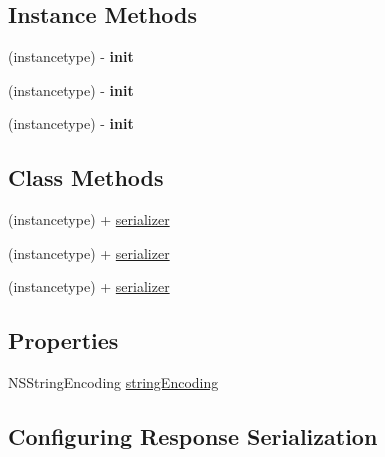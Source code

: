\subsection*{Instance Methods}
\begin{DoxyCompactItemize}
\item 
\mbox{\label{interface_a_f_h_t_t_p_response_serializer_ac68c43deaaf530d7b8a6cdd5228e6889}} 
(instancetype) -\/ {\bfseries init}
\item 
\mbox{\label{interface_a_f_h_t_t_p_response_serializer_ac68c43deaaf530d7b8a6cdd5228e6889}} 
(instancetype) -\/ {\bfseries init}
\item 
\mbox{\label{interface_a_f_h_t_t_p_response_serializer_ac68c43deaaf530d7b8a6cdd5228e6889}} 
(instancetype) -\/ {\bfseries init}
\end{DoxyCompactItemize}
\subsection*{Class Methods}
\begin{DoxyCompactItemize}
\item 
(instancetype) + \mbox{\hyperlink{interface_a_f_h_t_t_p_response_serializer_a9aee0c560f22d56f985170b0cdc0617f}{serializer}}
\item 
(instancetype) + \mbox{\hyperlink{interface_a_f_h_t_t_p_response_serializer_a9aee0c560f22d56f985170b0cdc0617f}{serializer}}
\item 
(instancetype) + \mbox{\hyperlink{interface_a_f_h_t_t_p_response_serializer_a9aee0c560f22d56f985170b0cdc0617f}{serializer}}
\end{DoxyCompactItemize}
\subsection*{Properties}
\begin{DoxyCompactItemize}
\item 
N\+S\+String\+Encoding \mbox{\hyperlink{interface_a_f_h_t_t_p_response_serializer_a91382381388e01522dabf5c81e91ca62}{string\+Encoding}}
\end{DoxyCompactItemize}
\subsection*{Configuring Response Serialization}
\label{_amgrp94c412383321d03aa01a99b81009d01e}%


